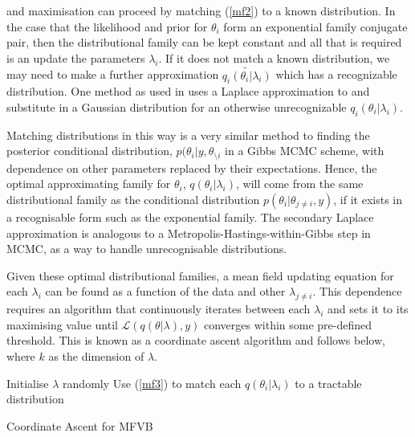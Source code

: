 \documentclass{article}\usepackage[]{graphicx}\usepackage[]{color}
\numberwithin{equation}{section}
\begin{document}
and maximisation can proceed by matching (\ref{mf2}) to a known distribution. In the case that the likelihood and prior for $\theta_i$ form an exponential family conjugate pair, then the distributional family can be kept constant and all that is required is an update the parameters $\lambda_i$. If it does not match a known distribution, we may need to make a further approximation $\tilde{q_i(\theta_i|\lambda_i)}$ which has a recognizable distribution. One method as used in \citet{Friston2006} uses a Laplace approximation to and substitute in a Gaussian distribution for an otherwise unrecognizable $q_i(\theta_i | \lambda_i)$. 

Matching distributions in this way is a very similar method to finding the posterior conditional distribution, $p(\theta_i | y, \theta_{\setminus i}$ in a Gibbs MCMC scheme, with dependence on other parameters replaced by their expectations. Hence, the optimal approximating family for $\theta_i$, $q(\theta_i | \lambda_i)$, will come from the same distributional family as the conditional distribution $p(\theta_i | \theta_{j \neq i}, y)$, if it exists in a recognisable form such as the exponential family. The secondary Laplace approximation is analogous to a Metropolis-Hastings-within-Gibbs step in MCMC, as a way to handle unrecognisable distributions.
\vspace{5mm}

Given these optimal distributional families, a mean field updating equation for each $\lambda_i$ can be found as a function of the data and other $\lambda_{j \neq i}$. This dependence requires an algorithm that continuously iterates between each $\lambda_i$ and sets it to its maximising value until $\mathcal{L}(q(\theta | \lambda), y)$ converges within some pre-defined threshold. This is known as a coordinate ascent algorithm and follows below, where $k$ as the dimension of $\lambda$.

\vspace{2mm}

\begin{algorithm}[H]
 Initialise $\lambda$ randomly\;
 Use (\ref{mf3}) to match each $q(\theta_i|\lambda_i)$ to a tractable distribution\;
 \caption{Coordinate Ascent for MFVB}
  \label{alg:algorithm1}
\end{algorithm}
\end{document}
